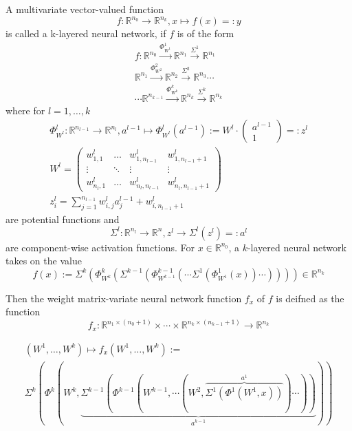 \documentclass[draft]{article}
\def\RealSet{\mathbb{R}}
\begin{document}
A multivariate vector-valued function
\[
f \colon \RealSet^{n_0} \rightarrow \RealSet^{n_k}, x\mapsto f(x)=:y
\]
is called a k-layered neural network, if $f$ is of the form
\begin{multline}
f \colon \RealSet^{n_0} \xrightarrow{\Phi_{W^1}^1} \RealSet^{n_1}
\xrightarrow{\Sigma^1} \RealSet^{n_1} \\
\RealSet^{n_1} \xrightarrow{\Phi_{W^2}^2} \RealSet^{n_2}
\xrightarrow{\Sigma^2} \RealSet^{n_3} \cdots \\
\cdots \RealSet^{n_{k-1}}
\xrightarrow{\Phi_{W^k}^k} \RealSet^{n_k}
\xrightarrow{\Sigma^k} \RealSet^{n_k}
\end{multline}
where for $l=1,\ldots,k$
\begin{gather}\label{Phi}
\Phi_{W^l}^l \colon \RealSet^{n_{l-1}} \rightarrow \RealSet^{n_l}, 
a^{l-1}\mapsto \Phi_{W^l}^l(a^{l-1}) :=W^l \cdot \begin{pmatrix} a^{l-1} \\ 1 \end{pmatrix} =: z^l \\
W^l = \begin{pmatrix}
w^l_{1,1} & \dots & w^l_{1,n_{l-1}} & w^l_{1,n_{l-1}+1} \\
\vdots & \ddots & \vdots & \vdots \\
w^l_{n_{l},1} & \dots & w^l_{n_{l},n_{l-1}} & w^l_{n_{l},n_{l-1}+1}
\end{pmatrix} \\
z^l_i = \sum_{j=1}^{n_{l-1}} w^l_{i, j} a^{l-1}_j + w^l_{i, n_{l-1}+1}
\end{gather}
are potential functions and
\begin{equation}\label{Sigma}
\Sigma^l \colon \RealSet^{n_{l}} \rightarrow \RealSet^{n},
z^l \rightarrow \Sigma^l(z^l) =: a^l
\end{equation}
are component-wise activation functions. For $x\in \RealSet^{n_0}$, a $k$-layered neural network takes on the value
\[
f(x) := \Sigma^k( \Phi_{W^k}^k( \Sigma^{k-1}( \Phi_{W^{k-1}}^{k-1}(\cdots \Sigma^1( \Phi_{W^1}^1(x) ) \cdots) ) ) ) \in \RealSet^{n_k}
\]

Then the weight matrix-variate neural network function $f_x$ of $f$ is deifned as the function
\[
f_x \colon \RealSet^{n_1 \times (n_0 + 1)} \times \cdots \times \RealSet^{n_k \times (n_{k-1} + 1)} \rightarrow \RealSet^{n_k}
\]

\begin{multline}\label{f_x}
(W^1,\dots,W^k)\mapsto f_x(W^1,\dots,W^k) := \\
\Sigma^k( \Phi^k( W^k, \underbrace{\Sigma^{k-1}( \Phi^{k-1}( W^{k-1}, \cdots (W^2, \overbrace{\Sigma^1( \Phi^1(W^1, x))}^{a^1}) \cdots) ) }_{a^{k-1}} ))
\end{multline}
\end{document}
